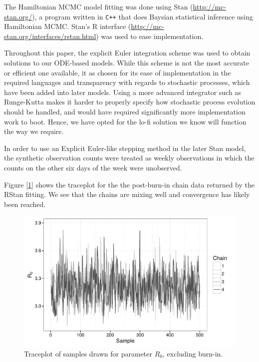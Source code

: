     The Hamiltonian MCMC model fitting was done using Stan (\url{http://mc-stan.org/}), a program written in \verb|C++| that does Baysian statistical inference using Hamiltonian MCMC. Stan's R interface (\url{http://mc-stan.org/interfaces/rstan.html}) was used to ease implementation.

    Throughout this paper, the explicit Euler integration scheme was used to obtain solutions to our ODE-based models. While this scheme is not the most accurate or efficient one available, it as chosen for its ease of implementation in the required languages and transparency with regards to stochastic processes, which have been added into later models. Using a more advanced integrator such as Runge-Kutta makes it harder to properly specify how stochastic process evolution should be handled, and would have required significantly more implementation work to boot. Hence, we have opted for the lo-fi solution we know will function the way we require.

    In order to use an Explicit Euler-like stepping method in the later Stan model, the synthetic observation counts were treated as weekly observations in which the counts on the other six days of the week were unobserved.

    Figure [\ref{traceplot}] shows the traceplot for the the post-burn-in chain data returned by the RStan fitting. We see that the chains are mixing well and convergence has likely been reached.

    \begin{figure}
        \centering
        \captionsetup{width=0.8\linewidth}
        \includegraphics[width=\textwidth]{./images/traceplotR0.pdf}
        \caption{Traceplot of samples drawn for parameter $R_0$, excluding burn-in. \label{traceplot}}
    \end{figure}

